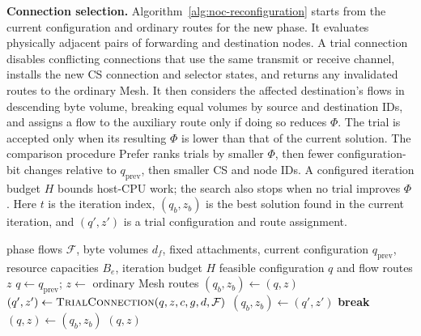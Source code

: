 \documentclass[conference,10pt]{IEEEtran}
\begin{document}
\noindent\textbf{Connection selection.}
Algorithm~\ref{alg:noc-reconfiguration} starts from the current configuration
and ordinary routes for the new phase. It evaluates physically adjacent
pairs of forwarding and destination nodes. A trial connection disables conflicting
connections that use the same transmit or receive channel, installs the new CS
connection and selector states, and returns any invalidated routes to the
ordinary Mesh. It then considers the affected destination's flows in descending
byte volume, breaking equal volumes by source and destination IDs, and assigns
a flow to the auxiliary route only if doing so reduces
$\Phi$. The trial is accepted only when its resulting $\Phi$ is lower than
that of the current solution. The comparison procedure Prefer ranks trials by
smaller $\Phi$, then fewer configuration-bit changes relative to
$q_{\mathrm{prev}}$, then smaller CS and node IDs. A configured iteration budget
$H$ bounds host-CPU work; the search also stops when no trial improves $\Phi$.
Here $t$ is the iteration index, $(q_b,z_b)$ is the best solution found in
the current iteration, and $(q',z')$ is a trial configuration and route assignment.

\begin{algorithm}[t]
\caption{Demand-Based CS Connection Selection}
\label{alg:noc-reconfiguration}
\begin{algorithmic}[1]
\Require phase flows $\mathcal F$, byte volumes $d_f$, fixed attachments,
  current configuration $q_{\mathrm{prev}}$, resource capacities $B_e$, iteration budget $H$
\Ensure feasible configuration $q$ and flow routes $z$
\Statex {}
\State $q\gets q_{\mathrm{prev}}$; $z\gets$ ordinary Mesh routes
  \Statex {}
  \State $(q_b,z_b)\gets(q,z)$
    \Statex {}
    \Statex {}
    \State $(q',z')\gets\Call{TrialConnection}{q,z,c,g,d,\mathcal F}$
    \Statex {}
      \State $(q_b,z_b)\gets(q',z')$
    \EndIf
  \EndFor
  \Statex {}
    \State \textbf{break}
  \EndIf
  \Statex {}
  \State $(q,z)\gets(q_b,z_b)$
\EndFor
\Statex {}
\State \Return $(q,z)$
\end{algorithmic}
\end{algorithm}
\end{document}
